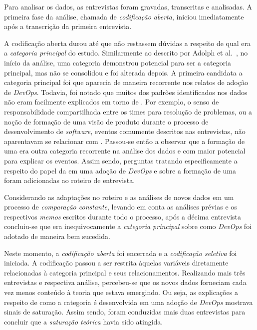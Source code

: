 Para analisar os dados, as entrevistas foram gravadas, transcritas e analisadas.
A primeira fase da análise, chamada de \emph{codificação aberta}, iniciou
imediatamente após a transcrição da primeira entrevista.

A codificação aberta durou até que não restassem dúvidas a respeito de qual era
a \emph{categoria principal} do estudo. Similarmente ao descrito por Adolph et
al.~\cite{reconciling_perspectives}, no início da análise, uma categoria
demonstrou potencial para ser a categoria principal, mas não se consolidou e foi
alterada depois. A primeira candidata a categoria principal foi 
que aparecia de maneira recorrente nos relatos de adoção de {\it DevOps}.
Todavia, foi notado que muitos dos padrões identificados nos dados não eram
facilmente explicados em torno de . Por exemplo, o senso de
responsabilidade compartilhada entre os times para resolução de problemas, ou
a noção de formação de uma visão de produto durante o processo de desenvolvimento
de {\it software}, eventos comumente descritos nas entrevistas, não aparentavam
se relacionar com . Passou-se então a observar que a formação de
uma \cc era outra categoria recorrente na análise dos dados e com maior
potencial para explicar os eventos. Assim sendo, perguntas tratando
especificamente a respeito do papel da  em uma adoção de {\it DevOps}
e sobre a formação de uma \cc foram adicionadas ao roteiro de entrevista.

Considerando as adaptações no roteiro e as análises de novos dados em um
processo de \emph{comparação constante}, levando em conta as análises prévias e
os respectivos {\it memos} escritos durante todo o processo, após a décima
entrevista concluiu-se que \cc era inequivocamente a \emph{categoria principal}
sobre como {\it DevOps} foi adotado de maneira bem sucedida.

Neste momento, a \emph{codificação aberta} foi encerrada e a \emph{codificação
seletiva} foi iniciada. A codificação passou a ser restrita àquelas variáveis
diretamente relacionadas à categoria principal e seus relacionamentos. Realizando
mais três entrevistas e respectiva análise, percebeu-se que os novos dados
forneciam cada vez menos conteúdo à teoria que estava emergindo. Ou seja, as
explicações a respeito de como a categoria \cc é desenvolvida em uma adoção de
{\it DevOps} mostrava sinais de saturação. Assim sendo, foram conduzidas mais
duas entrevistas para concluir que a \emph{saturação teórica} havia sido atingida.

